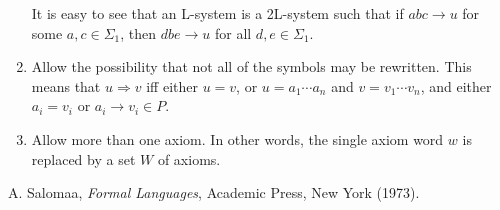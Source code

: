 \documentclass[12pt]{article}
\begin{document}
\begin{enumerate}
It is easy to see that an L-system is a 2L-system such that if $abc\to u$ for some $a,c\in \Sigma_1$, then $dbe\to u$ for all $d,e\in \Sigma_1$.
\item Allow the possibility that not all of the symbols may be rewritten.  This means that $u\Rightarrow v$ iff either $u=v$, or $u=a_1\cdots a_n$ and $v=v_1\cdots v_n$, and either $a_i=v_i$ or $a_i\to v_i \in P$.
\item Allow more than one axiom.  In other words, the single axiom word $w$ is replaced by a set $W$ of axioms.
\end{enumerate}

\begin{thebibliography}{9}
 A. Salomaa, {\em Formal Languages}, Academic Press, New York (1973).
\end{thebibliography}
\end{document}
